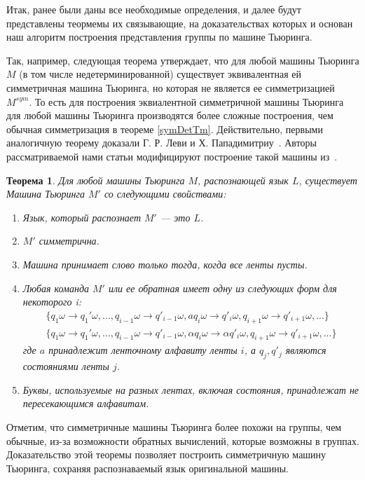 \documentclass[14pt]{matmex-diploma-custom}
\newtheorem{thm}{Теорема}[subsection]
\begin{document}
Итак, ранее были даны все необходимые определения, и далее будут представлены теормемы их связывающие,
на доказательствах которых и основан наш алгоритм построения представления группы по машине Тьюринга.

Так, например, следующая теорема утверждает, что для любой машины Тьюринга $M$ (в том числе недетерминированной) существует эквивалентная ей симметричная машина Тьюринга, но которая не является ее симметризацией $M^{sym}$. То есть для построения эквиалентной симметричной машины Тьюринга для любой машины Тьюринга производятся более сложные построения, чем обычная симметризация в теореме \ref{symDetTm}. Действительно, 
первыми аналогичную теорему доказали Г. Р. Леви и Х. Пападимитриу~\cite{LEWIS1982161}. 
Авторы рассматриваемой нами статьи модифицируют построение такой машины из~\cite{symTM}.

\begin{thm} \label{symthm}
Для любой машины Тьюринга $M$, распознающей язык $L$, существует
Машина Тьюринга $M'$ со следующими свойствами:
\begin{enumerate}
    \item Язык, который распознает $M'$ --- это $L$.
    \item $M'$ симметрична.
    \item Машина принимает слово только тогда, когда все ленты пусты.
    \item Любая команда $M'$ или ее обратная имеет одну из следующих форм для некоторого i:
    \begin{align}
        \{q_1\omega \to q_1'\omega, ..., q_{i−1}\omega \to q′_{i−1}\omega, 
        a q_i\omega \to q′_i\omega, q_{i+1}\omega \to q′_{i+1}\omega, ...\} \label{symType1} \\
        \{q_1\omega \to q_1'\omega, ..., q_{i−1}\omega \to q′_{i−1}\omega, 
        \alpha q_i\omega \to \alpha q′_i\omega, q_{i+1}\omega \to q′_{i+1}\omega, ...\} \label{symType2}
    \end{align}
    где $a$ принадлежит ленточному алфавиту ленты $i$, а $q_j, q′_j$ являются состояниями ленты $j$.
    \item Буквы, используемые на разных лентах, включая состояния, принадлежат не пересекающимся алфавитам.
\end{enumerate}
\end{thm}

Отметим, что симметричные машины Тьюринга более похожи на группы, чем обычные, из-за возможности обратных вычислений, которые возможны в группах.
Доказательство этой теоремы позволяет построить симметричную машину Тьюринга,
сохраняя распознаваемый язык оригинальной машины.
\end{document}
